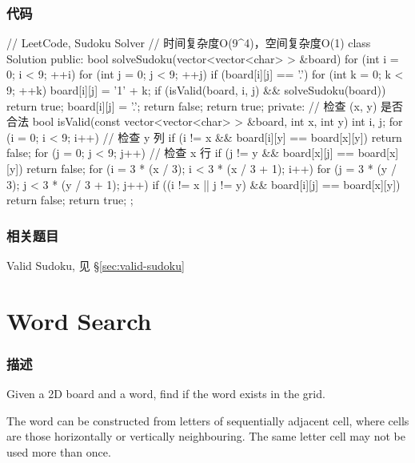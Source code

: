 \subsubsection{代码}
\begin{Code}
// LeetCode, Sudoku Solver
// 时间复杂度O(9^4)，空间复杂度O(1)
class Solution {
public:
    bool solveSudoku(vector<vector<char> > &board) {
        for (int i = 0; i < 9; ++i)
            for (int j = 0; j < 9; ++j) {
                if (board[i][j] == '.') {
                    for (int k = 0; k < 9; ++k) {
                        board[i][j] = '1' + k;
                        if (isValid(board, i, j) && solveSudoku(board))
                            return true;
                        board[i][j] = '.';
                    }
                    return false;
                }
            }
        return true;
    }
private:
    // 检查 (x, y) 是否合法
    bool isValid(const vector<vector<char> > &board, int x, int y) {
        int i, j;
        for (i = 0; i < 9; i++) // 检查 y 列
            if (i != x && board[i][y] == board[x][y])
                return false;
        for (j = 0; j < 9; j++) // 检查 x 行
            if (j != y && board[x][j] == board[x][y])
                return false;
        for (i = 3 * (x / 3); i < 3 * (x / 3 + 1); i++)
            for (j = 3 * (y / 3); j < 3 * (y / 3 + 1); j++)
                if ((i != x || j != y) && board[i][j] == board[x][y])
                    return false;
        return true;
    }
};
\end{Code}


\subsubsection{相关题目}
\begindot
\item Valid Sudoku, 见 \S \ref{sec:valid-sudoku}
\myenddot


\section{Word Search} %
\label{sec:word-search}


\subsubsection{描述}
Given a 2D board and a word, find if the word exists in the grid.

The word can be constructed from letters of sequentially adjacent cell, where  cells are those horizontally or vertically neighbouring. The same letter cell may not be used more than once.

